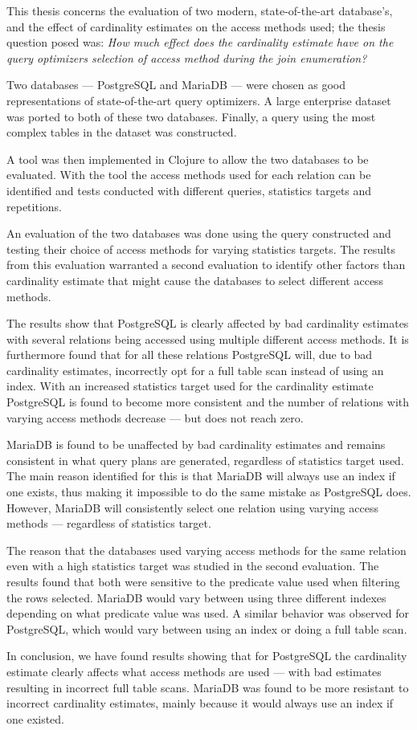 This thesis concerns the evaluation of two modern, state-of-the-art database's,
and the effect of cardinality estimates on the access methods used; the thesis
question posed was:
\textit{How much effect does the cardinality estimate have on the query optimizers
            selection of access method during the join enumeration?}

Two databases --- PostgreSQL and MariaDB --- were chosen as good representations of
state-of-the-art query optimizers. A large enterprise dataset was ported to both
of these two databases. Finally, a query using the most complex
tables in the dataset was constructed.

A tool was then implemented in Clojure to allow the two databases to be
evaluated. With the tool the access methods used for each relation can be
identified and tests conducted with different queries, statistics targets and
repetitions.

An evaluation of the two databases was done using the query constructed and
testing their choice of access methods for varying statistics targets. The results
from this evaluation warranted a second evaluation to identify other factors
than cardinality estimate that might cause the databases to select different
access methods.

The results show that PostgreSQL is clearly affected by bad cardinality
estimates with several relations being accessed using multiple different access
methods. It is furthermore found that for all these relations PostgreSQL will,
due to bad cardinality estimates, incorrectly opt for a full table scan instead
of using an index. With an increased statistics target used for the cardinality
estimate PostgreSQL is found to become more consistent and the number of
relations with varying access methods decrease --- but does not reach zero.

MariaDB is found to be unaffected by bad cardinality estimates and remains
consistent in what query plans are generated, regardless of statistics target
used. The main reason identified for this is that MariaDB will always use an
index if one exists, thus making it impossible to do the same mistake as
PostgreSQL does. However, MariaDB will consistently select one relation using
varying access methods --- regardless of statistics target.

The reason that the databases used varying access methods for the same relation
even with a high statistics target was studied in the second evaluation. The
results found that both were sensitive to the predicate value used when
filtering the rows selected. MariaDB would vary between using three different
indexes depending on what predicate value was used. A similar behavior was
observed for PostgreSQL, which would vary between using an index or doing a
full table scan.

In conclusion, we have found results showing that for PostgreSQL the cardinality
estimate clearly affects what access methods are used --- with bad estimates
resulting in incorrect full table scans. MariaDB was found to be more resistant
to incorrect cardinality estimates, mainly because it would always use an index
if one existed.